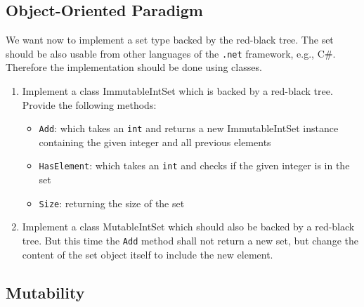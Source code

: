 \documentclass{article}
\begin{document}
\subsection{Object-Oriented Paradigm}

We want now to implement a set type backed by the red-black tree. The
set should be also usable from other languages of the \texttt{.net}
framework, e.g., C\#. Therefore the implementation should be done
using classes. 

\begin{enumerate}
  \item Implement a class ImmutableIntSet which is backed by a
    red-black tree. Provide the following methods:
    \begin{itemize}
      \item \texttt{Add}: which takes an \texttt{int} and returns a
        new ImmutableIntSet instance containing the given integer and
        all previous elements
      \item \texttt{HasElement}: which takes an \texttt{int} and
        checks if the given integer is in the set
      \item \texttt{Size}: returning the size of the set 
   \end{itemize}
  \item Implement a class MutableIntSet which should also be backed by a
    red-black tree. But this time the \texttt{Add} method shall not
    return a new set, but change the content of the set object itself
    to include the new element.
\end{enumerate}


\subsection{Mutability}
\end{document}
